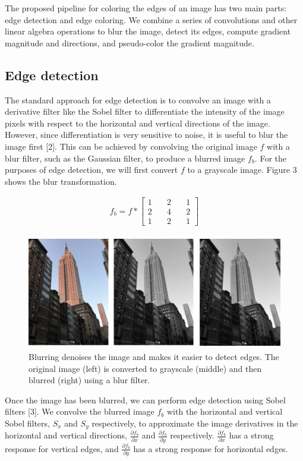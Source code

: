 \documentclass[runningheads]{llncs}
\begin{document}
The proposed pipeline for coloring the edges of an image has two main parts: edge detection and edge coloring. We combine a series of convolutions and other linear algebra operations to blur the image, detect its edges, compute gradient magnitude and directions, and pseudo-color the gradient magnitude.

\subsection{Edge detection}

The standard approach for edge detection is to convolve an image with a derivative filter like the Sobel filter to differentiate the intensity of the image pixels with respect to the horizontal and vertical directions of the image. However, since differentiation is very sensitive to noise, it is useful to blur the image first [2]. This can be achieved by convolving the original image $f$ with a blur filter, such as the Gaussian filter, to produce a blurred image $f_b$. For the purposes of edge detection, we will first convert $f$ to a grayscale image. Figure 3 shows the blur transformation.

\begin{align}
f_b = f * \begin{bmatrix} 
1 & \quad 2 & \quad 1 \\ 
2 & \quad 4 & \quad 2 \\ 
1 & \quad 2 & \quad 1  
\end{bmatrix}
\end{align}

\begin{figure}
\centering
\includegraphics[height=5cm]{images/blur.png}
\caption{Blurring denoises the image and makes it easier to detect edges. The original image (left) is converted to grayscale (middle) and then blurred (right) using a blur filter.}
\label{fig:example}
\end{figure}

Once the image has been blurred, we can perform edge detection using Sobel filters [3]. We convolve the blurred image $f_b$ with the horizontal and vertical Sobel filters, $S_x$ and $S_y$ respectively, to approximate the image derivatives in the horizontal and vertical directions, $\frac{\partial f_b}{\partial x}$ and $\frac{\partial f_b}{\partial y}$ respectively. $\frac{\partial f_b}{\partial x}$ has a strong response for vertical edges, and $\frac{\partial f_b}{\partial y}$ has a strong response for horizontal edges.
\end{document}

